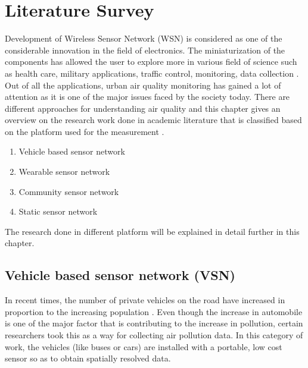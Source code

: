\chapter{Literature Survey}

Development of Wireless Sensor Network (WSN) is considered as one of the considerable innovation in the field of electronics. The miniaturization of the components has allowed the user to explore more in various field of science such as health care, military applications, traffic control, monitoring, data collection \cite{Khedo2017} \cite{Liu2017}. Out of all the applications, urban air quality monitoring has gained a lot of attention as it is one of the major issues faced by the society today. There are different approaches for understanding air quality and this chapter gives an overview on the research work done in academic literature that is classified based on the platform used for the measurement\cite{Yi2015} \cite{Pavani2017}.
 
\begin{enumerate}

    \item Vehicle based sensor network
    \item Wearable sensor network
    \item Community sensor network
    \item Static sensor network

 \end{enumerate} 

 The research done in different platform will be explained in detail further in this chapter.

\section{Vehicle based sensor network (VSN)}

In recent times, the number of private vehicles on the road have increased in proportion to the increasing population \cite{Downs2004}. Even though the increase in automobile is one of the major factor that is contributing to the increase in pollution, certain researchers took this as a way for collecting air pollution data. In this category of work, the vehicles (like buses or cars) are installed with a portable, low cost sensor so as to obtain spatially resolved data. 
\par

